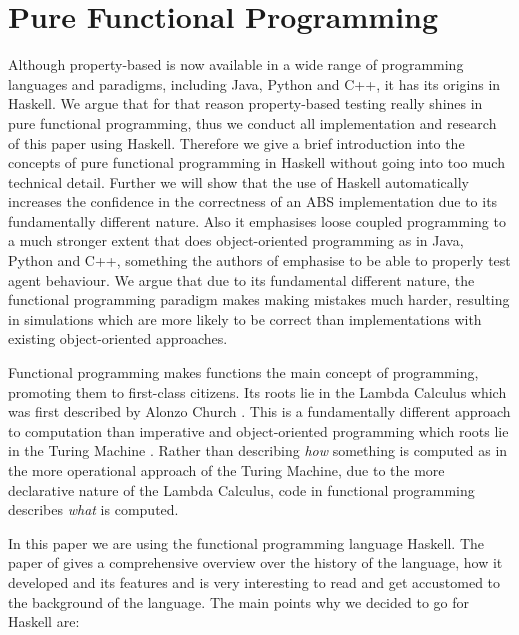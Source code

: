 \section{Pure Functional Programming}
\label{sec:fp}

Although property-based is now available in a wide range of programming languages and paradigms, including Java, Python and C++, it has its origins in Haskell. %
We argue that for that reason property-based testing really shines in pure functional programming, thus we conduct all implementation and research of this paper using Haskell. Therefore we give a brief introduction into the concepts of pure functional programming in Haskell without going into too much technical detail. Further we will show that the use of Haskell automatically increases the confidence in the correctness of an ABS implementation due to its fundamentally different nature. Also it emphasises loose coupled programming to a much stronger extent that does object-oriented programming as in Java, Python and C++, something the authors of \cite{collier_test-driven_2013} emphasise to be able to properly test agent behaviour. We argue that due to its fundamental different nature, the functional programming paradigm makes making mistakes much harder, resulting in simulations which are more likely to be correct than implementations with existing object-oriented approaches.

Functional programming makes functions the main concept of programming, promoting them to first-class citizens. Its roots lie in the Lambda Calculus which was first described by Alonzo Church \citep{church_unsolvable_1936}. This is a fundamentally different approach to computation than imperative and object-oriented programming which roots lie in the Turing Machine \citep{turing_computable_1937}. Rather than describing \textit{how} something is computed as in the more operational approach of the Turing Machine, due to the more declarative nature of the Lambda Calculus, code in functional programming describes \textit{what} is computed.

In this paper we are using the functional programming language Haskell. The paper of \citep{hudak_history_2007} gives a comprehensive overview over the history of the language, how it developed and its features and is very interesting to read and get accustomed to the background of the language. The main points why we decided to go for Haskell are:


